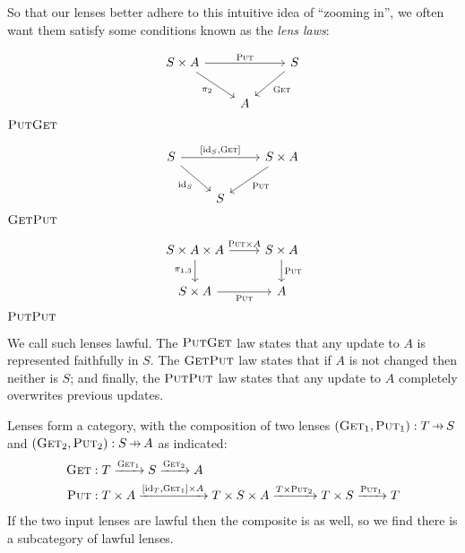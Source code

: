 \documentclass[11pt,letterpaper]{article}
\theoremstyle{plain}
\theoremstyle{definition}
\newcommand{\id}{\mathrm{id}}
\newcommand{\fget}{\textsc{Get}}
\newcommand{\fput}{\textsc{Put}}
\newcommand{\hto}{\ensuremath{\,\mathaccent\shortmid\rightarrow\,}}
\begin{document}
So that our lenses better adhere to this intuitive idea of ``zooming in'', we often want them satisfy some conditions known as the \emph{lens laws}:
\begin{center}
\begin{minipage}[b]{0.33333\textwidth}
\begin{center}
\[
\begin{tikzcd}
S \times A \ar[rr, "\fput"] \ar[dr, "\pi_2", swap] && S \ar[dl, "\fget"] \\
& A
\end{tikzcd}
\]
\hspace{0.8cm}$\fput\fget$
\end{center}
\end{minipage}%
\begin{minipage}[b]{0.33333\textwidth}
\begin{center}
\[
\begin{tikzcd}
S \ar[rr, "{[\id_S, \fget]}"] \ar[dr, "\id_S", swap] && S \times A \ar[dl, "\fput"] \\
& S
\end{tikzcd}
\]
\hspace{-0.6cm}$\fget\fput$
\end{center}
\end{minipage}%
\begin{minipage}[b]{0.33333\textwidth}
\begin{center}
\[
\begin{tikzcd}
S \times A \times A \ar[r, "\fput \times A"] \ar[d, "\pi_{1, 3}", swap] & S \times A\ar[d, "\fput"] \\
S \times A \ar[r, "\fput", swap] & A
\end{tikzcd}
\]
\quad$\fput\fput$
\end{center}
\end{minipage}%
\end{center}
We call such lenses lawful. The $\fput\fget$ law states that any update to $A$ is represented faithfully in $S$. The $\fget\fput$ law states that if $A$ is not changed then neither is $S$; and finally, the $\fput\fput$ law states that any update to $A$ completely overwrites previous updates.

Lenses form a category, with the composition of two lenses $(\fget_1, \fput_1) : T \hto S$ and $(\fget_2, \fput_2) : S \hto A$ as indicated:
\begin{align*}
\fget &: T \xrightarrow{\fget_1} S \xrightarrow{\fget_2} A \\
\fput &: T \times A \xrightarrow{[\id_T, \fget_1] \times A} T \times S \times A \xrightarrow{T \times \fput_2} T \times S \xrightarrow{\fput_1} T
\end{align*}
If the two input lenses are lawful then the composite is as well, so we find there is a subcategory of lawful lenses.
\end{document}
